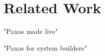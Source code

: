 \section{Related Work}


"Paxos made live"
\cite{CGR07:PODC}

"Paxos for system builders"
\cite{AK08:LADIS}